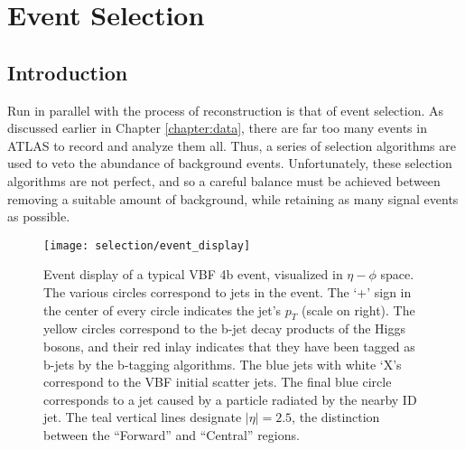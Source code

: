 \chapter{Event Selection} \label{chapter:selection}

\section{Introduction}

    Run in parallel with the process of reconstruction is that of event selection.
    As discussed earlier in Chapter \ref{chapter:data},
        there are far too many events in ATLAS to record and analyze them all.
    Thus, a series of selection algorithms are used to veto the abundance of background events.
    Unfortunately, these selection algorithms are not perfect,
        and so a careful balance must be achieved between removing a suitable amount of background,
        while retaining as many signal events as possible.

    \begin{figure}[tbh]
        \texttt{[image: selection/event\_display]}
        \caption{
            Event display of a typical VBF \to 4b event, visualized in $\eta-\phi$ space.
            The various circles correspond to jets in the event.
            The `+' sign in the center of every circle indicates the jet's $p_T$ (scale on right).
            The yellow circles correspond to the b-jet decay products of the Higgs bosons,
                and their red inlay indicates that they have been tagged as b-jets by the b-tagging algorithms.
            The blue jets with white `X's correspond to the VBF initial scatter jets.
            The final blue circle corresponds to a jet caused by a particle radiated by the nearby ID jet.
            The teal vertical lines designate $|\eta|=2.5$,
                the distinction between the ``Forward'' and ``Central'' regions.
        }
        \label{fig:event_display}
    \end{figure}

    
